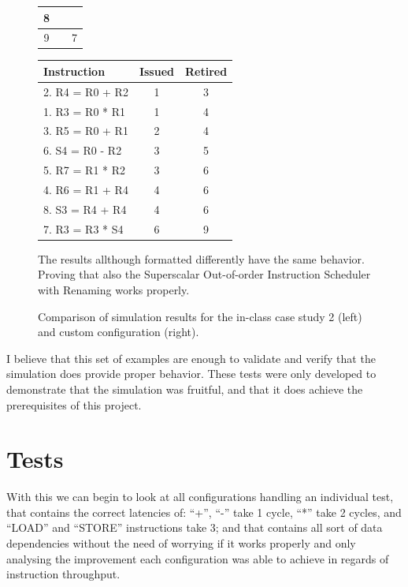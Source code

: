 \documentclass{article}
\begin{document}
\begin{enumerate}
\begin{figure}[H]
\begin{minipage}[t]{0.45\textwidth}
\begin{tabular}{|c|p{3.4cm}|c|}
                8 & & \\ \hline 
                9 & & 7 \\ \hline 
            \end{tabular}
        \end{minipage}
        \begin{minipage}[t]{0.45\textwidth}
            \centering
            \renewcommand{\arraystretch}{1.2} %
            \setlength{\tabcolsep}{3pt} %
            \begin{tabular}{|p{3.4cm}|c|c|}
                \hline
                \textbf{Instruction} & \textbf{Issued} & \textbf{Retired} \\ \hline
                2. R4 = R0 + R2 & 1 & 3 \\ \hline 
                1. R3 = R0 * R1 & 1 & 4 \\ \hline 
                3. R5 = R0 + R1 & 2 & 4 \\ \hline 
                6. S4 = R0 - R2 & 3 & 5 \\ \hline 
                5. R7 = R1 * R2 & 3 & 6 \\ \hline 
                4. R6 = R1 + R4 & 4 & 6 \\ \hline 
                8. S3 = R4 + R4 & 4 & 6 \\ \hline 
                7. R3 = R3 * S4 & 6 & 9 \\ \hline 
            \end{tabular}
            \vspace{1em} %
            \raggedright

            The results allthough formatted differently have the same behavior. Proving that also the Superscalar Out-of-order Instruction Scheduler with Renaming works properly. 
        \end{minipage}
        \caption{Comparison of simulation results for the in-class case study 2 (left) and custom configuration (right).}
    \end{figure}
\end{enumerate}

I believe that this set of examples are enough to validate and verify that the simulation does provide proper behavior. These tests were only developed to demonstrate that the simulation was fruitful, and that it does achieve the prerequisites of this project. 

\section{Tests}
With this we can begin to look at all configurations handling an individual test, that contains the correct latencies of: ``+'', ``-'' take 1 cycle, ``*'' take 2 cycles, and ``LOAD'' and ``STORE'' instructions take 3; and that contains all sort of data dependencies without the need of worrying if it works properly and only analysing the improvement each configuration was able to achieve in regards of instruction throughput.
\end{document}
